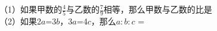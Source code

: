 （1）如果甲数的$\frac{4}{5}$与乙数的$\frac{7}{9}$相等，那么甲数与乙数的比是\key{\hspace{2cm}} \\

\hspace*{4mm}（2）如果2$a$=3$b$，3$a$=4$c$，那么$a:b:c$ = \key{\hspace{2cm}}



